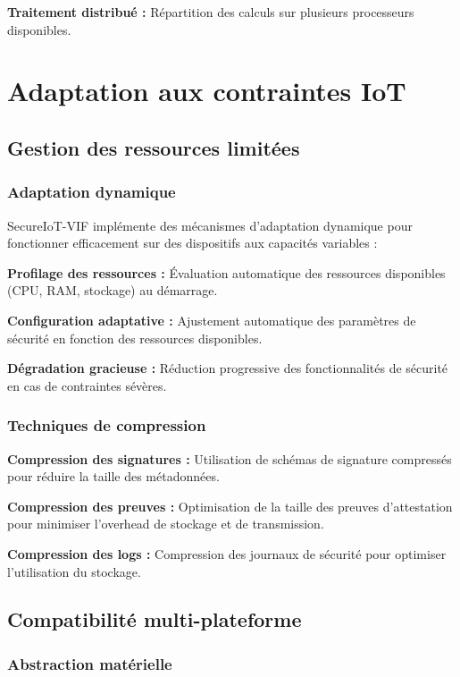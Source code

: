 \textbf{Traitement distribué :} Répartition des calculs sur plusieurs processeurs disponibles.

\section{Adaptation aux contraintes IoT}

\subsection{Gestion des ressources limitées}

\subsubsection{Adaptation dynamique}

SecureIoT-VIF implémente des mécanismes d'adaptation dynamique pour fonctionner efficacement sur des dispositifs aux capacités variables :

\textbf{Profilage des ressources :} Évaluation automatique des ressources disponibles (CPU, RAM, stockage) au démarrage.

\textbf{Configuration adaptative :} Ajustement automatique des paramètres de sécurité en fonction des ressources disponibles.

\textbf{Dégradation gracieuse :} Réduction progressive des fonctionnalités de sécurité en cas de contraintes sévères.

\subsubsection{Techniques de compression}

\textbf{Compression des signatures :} Utilisation de schémas de signature compressés pour réduire la taille des métadonnées.

\textbf{Compression des preuves :} Optimisation de la taille des preuves d'attestation pour minimiser l'overhead de stockage et de transmission.

\textbf{Compression des logs :} Compression des journaux de sécurité pour optimiser l'utilisation du stockage.

\subsection{Compatibilité multi-plateforme}

\subsubsection{Abstraction matérielle}

